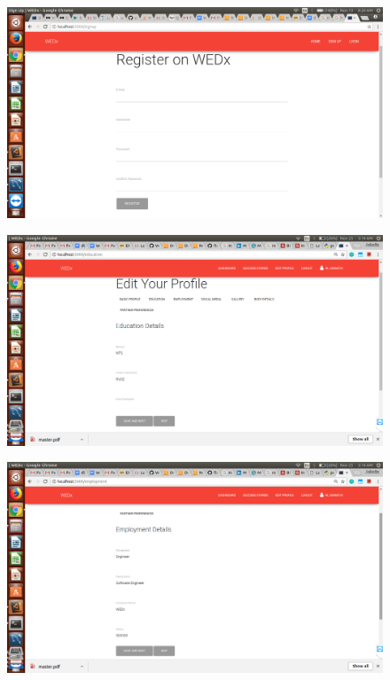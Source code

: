\documentclass[12pt]{report}
\begin{document}
\begin{figure}[!htb]
    \centering
    \includegraphics[width=1\textwidth]{sc-2.png}
\end{figure}

\begin{figure}[!htb]
    \centering
    \includegraphics[width=1\textwidth]{sc-3.png}
\end{figure}

\begin{figure}[!htb]
    \centering
    \includegraphics[width=1\textwidth]{sc-4.png}
\end{figure}
\end{document}
